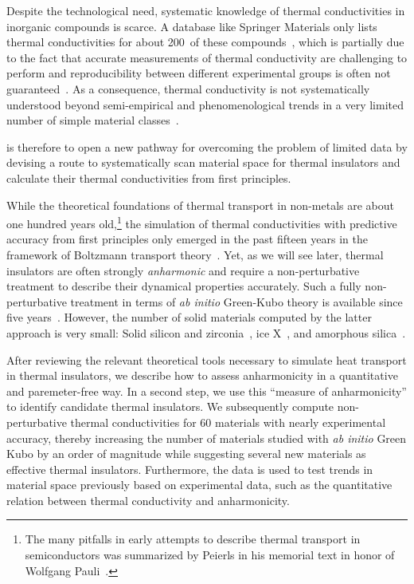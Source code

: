 Despite the technological need, systematic knowledge of thermal conductivities in inorganic compounds is scarce. A database like Springer Materials only lists thermal conductivities for about 200~of these compounds~\cite{SpringerMaterials}, which is partially due to the fact that accurate measurements of thermal conductivity are challenging to perform and reproducibility between different experimental groups is often not guaranteed~\cite{wei2016}. As a consequence, thermal conductivity is not systematically understood beyond semi-empirical and phenomenological trends in a very limited number of simple material classes~\cite{morelli2006}.

 is therefore to open a new pathway for overcoming the problem of limited data by devising a route to systematically scan material space for thermal insulators and calculate their thermal conductivities from first principles. 

While the theoretical foundations of thermal transport in non-metals are about one hundred years old,\footnote{The many pitfalls in early attempts to describe thermal transport in semiconductors was summarized by Peierls in his memorial text in honor of Wolfgang Pauli~\cite{Peierls1960}.} the simulation of thermal conductivities with predictive accuracy from first principles only emerged in the past fifteen years in the framework of Boltzmann transport theory~\cite{Broido2007}. Yet, as we will see later, thermal insulators are often strongly \emph{anharmonic} and require a non-perturbative treatment to describe their dynamical properties accurately. Such a fully non-perturbative treatment in terms of \emph{ab initio} Green-Kubo theory is available since five years~\cite{Marcolongo2016,Carbogno2016}. However, the number of solid materials computed by the latter approach is very small: Solid silicon and zirconia~\cite{Carbogno2016}, ice X~\cite{Grasselli2020}, and amorphous silica~\cite{Marcolongo2020}. 

 After reviewing the relevant theoretical tools necessary to simulate heat transport in thermal insulators, we describe how to assess anharmonicity in a quantitative and paremeter-free way. In a second step, we use this ``measure of anharmonicity'' to identify candidate thermal insulators. We subsequently compute non-perturbative thermal conductivities for 60 materials with nearly experimental accuracy, thereby increasing the number of materials studied with \emph{ab initio} Green Kubo by an order of magnitude while suggesting several new materials as effective thermal insulators. Furthermore, the data is used to test trends in material space previously based on experimental data, such as the quantitative relation between thermal conductivity and anharmonicity.


